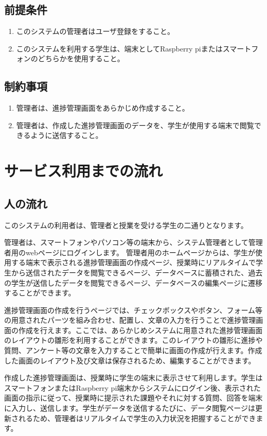 \documentclass[a4j,titlepage]{ujarticle}
\begin{document}
\subsection{前提条件}
\begin{enumerate}[(1)]
\item このシステムの管理者はユーザ登録をすること。
\item このシステムを利用する学生は、端末としてRaspberry piまたはスマートフォンのどちらかを使用すること。
\end{enumerate}

\subsection{制約事項}
\begin{enumerate}[(1)]
\item 管理者は、進捗管理画面をあらかじめ作成すること。
\item 管理者は、作成した進捗管理画面のデータを、学生が使用する端末で閲覧できるように送信すること。
\end{enumerate}

\section{サービス利用までの流れ}
\subsection{人の流れ}
このシステムの利用者は、管理者と授業を受ける学生の二通りとなります。

管理者は、スマートフォンやパソコン等の端末から、システム管理者として管理者用のwebページにログインします。
管理者用のホームページからは、学生が使用する端末で表示される進捗管理画面の作成ページ、授業時にリアルタイムで学生から送信されたデータを閲覧できるページ、データベースに蓄積された、過去の学生が送信したデータを閲覧できるページ、データベースの編集ページに遷移することができます。

進捗管理画面の作成を行うページでは、チェックボックスやボタン、フォーム等の用意されたパーツを組み合わせ、配置し、文章の入力を行うことで進捗管理画面の作成を行えます。ここでは、あらかじめシステムに用意された進捗管理画面のレイアウトの雛形を利用することができます。このレイアウトの雛形に進捗や質問、アンケート等の文章を入力することで簡単に画面の作成が行えます。作成した画面のレイアウト及び文章は保存されるため、編集することができます。

作成した進捗管理画面は、授業時に学生の端末に表示させて利用します。学生はスマートフォンまたはRaspberry pi端末からシステムにログイン後、表示された画面の指示に従って、授業時に提示された課題やそれに対する質問、回答を端末に入力し、送信します。学生がデータを送信するたびに、データ閲覧ページは更新されるため、管理者はリアルタイムで学生の入力状況を把握することができます。
\end{document}
